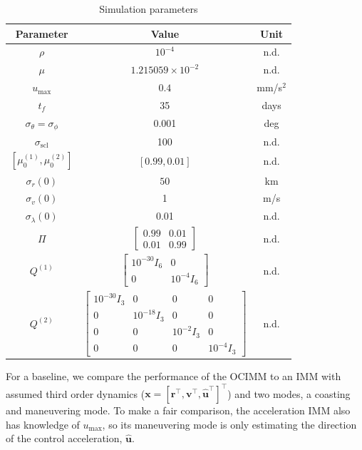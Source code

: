\documentclass[letterpaper, preprint, paper,11pt]{AAS}	%
\begin{document}
\begin{table}
    \centering
    \begin{tabular}{c|c|c}
        Parameter & Value & Unit \\
        \hline
        $\rho$ & $10^{-4}$ & n.d. \\
        $\mu$ & $1.215059\times 10^{-2}$ & n.d. \\
        $u_\text{max}$ & $0.4$ & mm/s$^2$ \\
        $t_f$ & 35 & days \\
        $\sigma_\theta = \sigma_\phi$ & 0.001 & deg \\
        $\sigma_\text{scl}$ & 100 & n.d. \\
        $[\mu_0^{(1)}, \mu_0^{(2)}]$ & $[0.99, 0.01]$ & n.d. \\
        $\sigma_r(0)$ & $50$ & km \\
        $\sigma_v(0)$ & 1 & m/s \\
        $\sigma_{\lambda}(0)$ & 0.01 & n.d. \\
        $\Pi$ & $\begin{bmatrix}
            0.99 & 0.01 \\
            0.01 & 0.99
        \end{bmatrix}$ & n.d. \\
        $Q^{(1)}$ & $\begin{bmatrix}
            10^{-30}I_6 & 0  \\
            0 & 10^{-4}I_6
        \end{bmatrix}$ & n.d. \\
        $Q^{(2)}$ & $\begin{bmatrix}
            10^{-30}I_3 & 0 & 0 & 0 \\
            0 & 10^{-18}I_3 & 0 & 0 \\
            0 & 0 & 10^{-2}I_3 & 0 \\
            0 & 0 & 0 & 10^{-4}I_3
        \end{bmatrix}$ & n.d.
    \end{tabular}
    \caption{Simulation parameters}
    \label{tab:truth-parameters}
\end{table}

For a baseline, we compare the performance of the OCIMM to an IMM with assumed third order dynamics ($\bm{x} = [\bm{r}^\top, \bm{v}^\top, \hat{\bm{u}}^\top]^\top$) and two modes, a coasting and maneuvering mode. To make a fair comparison, the acceleration IMM also has knowledge of $u_\text{max}$, so its maneuvering mode is only estimating the direction of the control acceleration, $\hat{\bm{u}}$.
\end{document}
